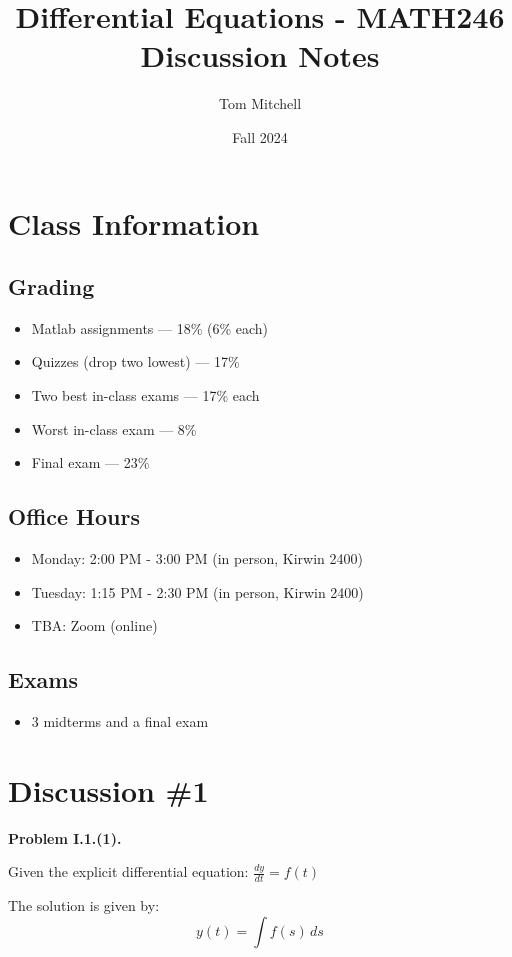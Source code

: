 \documentclass{article}
\title{Differential Equations - MATH246 Discussion Notes}
\author{Tom Mitchell}
\date{Fall 2024}
\begin{document}
\maketitle

\section*{Class Information}

\subsection*{Grading}
\begin{itemize}
    \item Matlab assignments — 18\% (6\% each)
    \item Quizzes (drop two lowest) — 17\%
    \item Two best in-class exams — 17\% each
    \item Worst in-class exam — 8\%
    \item Final exam — 23\%
\end{itemize}

\subsection*{Office Hours}
\begin{itemize}
    \item Monday: 2:00 PM - 3:00 PM (in person, Kirwin 2400)
    \item Tuesday: 1:15 PM - 2:30 PM (in person, Kirwin 2400)
    \item TBA: Zoom (online)
\end{itemize}

\subsection*{Exams}
\begin{itemize}
    \item 3 midterms and a final exam
\end{itemize}

\section*{Discussion \#1}

\textbf{Problem I.1.(1).}

Given the explicit differential equation: \(\frac{dy}{dt} = f(t)\)

The solution is given by: 
\[
y(t) = \int f(s) \, ds
\]
\end{document}
